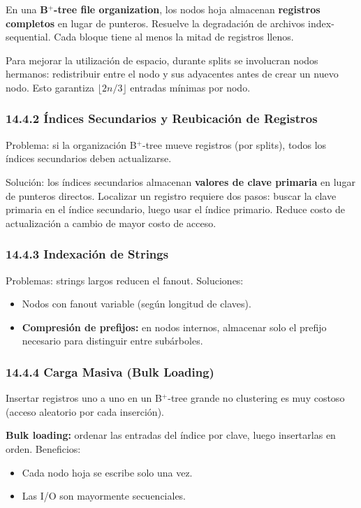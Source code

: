 \documentclass[11pt, a4paper]{article}
\begin{document}
En una \textbf{B$^+$-tree file organization}, los nodos hoja almacenan \textbf{registros completos} en lugar de punteros. Resuelve la degradación de archivos index-sequential. Cada bloque tiene al menos la mitad de registros llenos.

Para mejorar la utilización de espacio, durante splits se involucran nodos hermanos: redistribuir entre el nodo y sus adyacentes antes de crear un nuevo nodo. Esto garantiza $\lfloor 2n/3 \rfloor$ entradas mínimas por nodo.

\subsubsection{14.4.2 Índices Secundarios y Reubicación de Registros}

Problema: si la organización B$^+$-tree mueve registros (por splits), todos los índices secundarios deben actualizarse.

Solución: los índices secundarios almacenan \textbf{valores de clave primaria} en lugar de punteros directos. Localizar un registro requiere dos pasos: buscar la clave primaria en el índice secundario, luego usar el índice primario. Reduce costo de actualización a cambio de mayor costo de acceso.

\subsubsection{14.4.3 Indexación de Strings}

Problemas: strings largos reducen el fanout. Soluciones:
\begin{itemize}[nosep]
	\item Nodos con fanout variable (según longitud de claves).
	\item \textbf{Compresión de prefijos:} en nodos internos, almacenar solo el prefijo necesario para distinguir entre subárboles.
\end{itemize}

\subsubsection{14.4.4 Carga Masiva (Bulk Loading)}

Insertar registros uno a uno en un B$^+$-tree grande no clustering es muy costoso (acceso aleatorio por cada inserción).

\textbf{Bulk loading:} ordenar las entradas del índice por clave, luego insertarlas en orden. Beneficios:
\begin{itemize}[nosep]
	\item Cada nodo hoja se escribe solo una vez.
	\item Las I/O son mayormente secuenciales.
\end{itemize}
\end{document}
